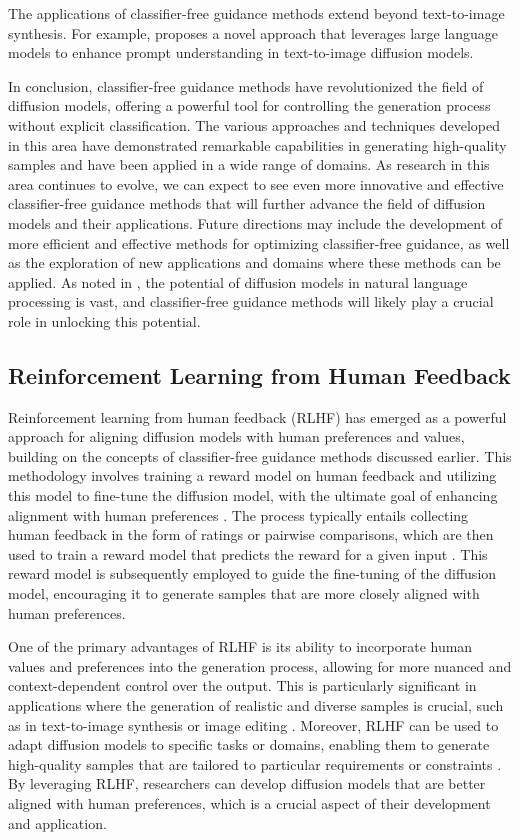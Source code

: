 \documentclass[11pt,a4paper]{article}
\begin{document}
The applications of classifier-free guidance methods extend beyond text-to-image synthesis. For example, \cite{arxiv:2305.13655} proposes a novel approach that leverages large language models to enhance prompt understanding in text-to-image diffusion models. 

In conclusion, classifier-free guidance methods have revolutionized the field of diffusion models, offering a powerful tool for controlling the generation process without explicit classification. The various approaches and techniques developed in this area have demonstrated remarkable capabilities in generating high-quality samples and have been applied in a wide range of domains. As research in this area continues to evolve, we can expect to see even more innovative and effective classifier-free guidance methods that will further advance the field of diffusion models and their applications. Future directions may include the development of more efficient and effective methods for optimizing classifier-free guidance, as well as the exploration of new applications and domains where these methods can be applied. As noted in \cite{arxiv:2303.07576}, the potential of diffusion models in natural language processing is vast, and classifier-free guidance methods will likely play a crucial role in unlocking this potential.


\subsection{Reinforcement Learning from Human Feedback}


Reinforcement learning from human feedback (RLHF) has emerged as a powerful approach for aligning diffusion models with human preferences and values, building on the concepts of classifier-free guidance methods discussed earlier. This methodology involves training a reward model on human feedback and utilizing this model to fine-tune the diffusion model, with the ultimate goal of enhancing alignment with human preferences \cite{arxiv:2305.13301}. The process typically entails collecting human feedback in the form of ratings or pairwise comparisons, which are then used to train a reward model that predicts the reward for a given input \cite{arxiv:2303.07576}. This reward model is subsequently employed to guide the fine-tuning of the diffusion model, encouraging it to generate samples that are more closely aligned with human preferences.

One of the primary advantages of RLHF is its ability to incorporate human values and preferences into the generation process, allowing for more nuanced and context-dependent control over the output. This is particularly significant in applications where the generation of realistic and diverse samples is crucial, such as in text-to-image synthesis or image editing \cite{arxiv:2402.16369}. Moreover, RLHF can be used to adapt diffusion models to specific tasks or domains, enabling them to generate high-quality samples that are tailored to particular requirements or constraints \cite{doi:10.1109/tpami.2025.3545047}. By leveraging RLHF, researchers can develop diffusion models that are better aligned with human preferences, which is a crucial aspect of their development and application.
\end{document}
